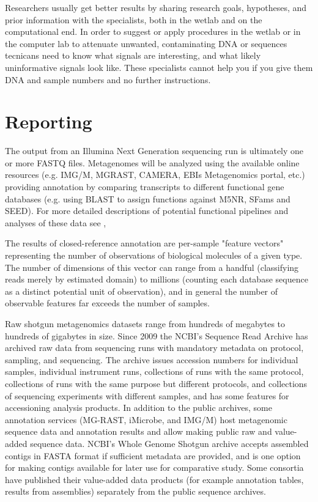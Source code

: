 \documentclass[graybox]{svmult}
\begin{document}
Researchers usually get better results by sharing research goals, hypotheses, and prior information with the specialists, both in the wetlab and on the computational end.  In order to suggest or apply procedures in the wetlab or in the computer lab to attenuate unwanted, contaminating DNA or sequences tecnicans need to know what signals are interesting, and what likely uninformative signals look like.  These specialists cannot help you if you give them DNA and sample numbers and no further instructions.  

\section{Reporting }
\label{sec:5}

The output from an Illumina Next Generation sequencing run is ultimately one or more FASTQ files.\cite{Cock2010FASTQ} 
Metagenomes will be analyzed using the available online resources (e.g. IMG/M, MGRAST, CAMERA, EBIs Metagenomics portal, etc.) providing annotation by comparing transcripts to different functional gene databases (e.g. using BLAST to assign functions against M5NR, SFams and SEED). For more detailed descriptions of potential functional pipelines and analyses of these data see \cite{Thomas2012Metagenomics}, \cite{Meyer2008Metagenomics} \cite{Wilke2015RESTful}

        The results of closed-reference annotation are per-sample "feature vectors" representing the number of observations of biological molecules of a given type.  The number of dimensions of this vector can range from a handful (classifying reads merely by estimated domain) to millions (counting each database sequence as a distinct potential unit of observation), and in general the number of observable features far exceeds the number of samples.

        Raw shotgun metagenomics datasets range from hundreds of megabytes to hundreds of gigabytes in size.  Since 2009 the NCBI's Sequence Read Archive has archived raw data from sequencing runs with mandatory metadata on protocol, sampling, and sequencing.  The archive issues accession numbers for individual samples, individual instrument runs, collections of runs with the same protocol, collections of runs with the same purpose but different protocols, and collections of sequencing experiments with different samples, and has some features for accessioning analysis products.  
In addition to the public archives, some annotation services (MG-RAST, iMicrobe, and IMG/M) host metagenomic sequence data and annotation results and allow making public raw and value-added sequence data.    NCBI's Whole Genome Shotgun archive accepts assembled contigs in FASTA format if sufficient metadata are provided, and is one option for making contigs available for later use for comparative study.
Some consortia have published their value-added data products (for example annotation tables, results from assemblies) separately from the public sequence archives.
\end{document}
